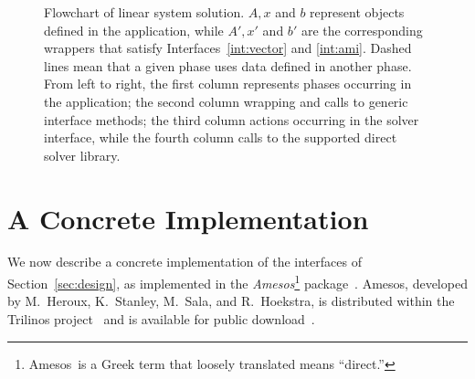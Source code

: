 \documentclass[acmtoms,acmnow]{acmtrans2m}
\newcommand{\amesos}{{\sc Amesos}}
\begin{document}
\begin{figure}
\begin{center}
\end{center}
\caption{Flowchart of linear system solution. $A, x$ and $b$ represent objects
  defined in the application, while $A', x'$ and $b'$ are the corresponding
    wrappers that
    satisfy Interfaces~\ref{int:vector} and \ref{int:ami}. Dashed lines mean
    that a given phase uses data defined in another phase. From left to right,
  the first column
    represents phases occurring in the application; the second column wrapping
and calls to generic interface methods; the third column actions
occurring in the solver interface, while the fourth column calls to the supported
direct solver library.}
\label{fig:flowchart}
\end{figure}

\section{A Concrete Implementation}
\label{sec:concrete}

We now describe a concrete implementation of the interfaces of
Section~\ref{sec:design}, as implemented in
the {\sl \amesos}\footnote{
\amesos\ is a Greek term that loosely translated means ``direct.''} package~\cite{Amesos-Reference-Guide}.
\amesos,
developed by M.~Heroux, K.~Stanley,
M.~Sala, and R.~Hoekstra, is distributed within the
Trilinos project~\cite{heroux05trilinos} and is available for public
download~\cite{amesos-web-page}.
\end{document}
